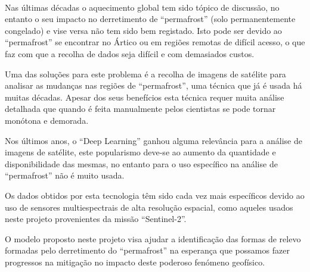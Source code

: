 
\paragraph{}
Nas últimas décadas o aquecimento global tem sido tópico de discussão, no entanto o seu impacto no derretimento de “permafrost” (solo permanentemente congelado) e vise versa não tem sido bem registado. Isto pode ser devido ao “permafrost” se encontrar no Ártico ou em regiões remotas de difícil acesso, o que faz com que a recolha de dados seja difícil e com demasiados custos.

Uma das soluções para este problema é a recolha de imagens de satélite para analisar as mudanças nas regiões de “permafrost”, uma técnica que já é usada há muitas décadas. Apesar dos seus benefícios esta técnica requer muita análise detalhada que quando é feita manualmente pelos cientistas se pode tornar monótona e demorada.

Nos últimos anos, o “Deep Learning” ganhou alguma relevância para a análise de imagens de satélite, este popularismo deve-se ao aumento da quantidade e disponibilidade das mesmas, no entanto para o uso específico na análise de “permafrost” não é muito usada.

Os dados obtidos por esta tecnologia têm sido cada vez mais específicos devido ao uso de sensores multiespectrais de alta resolução espacial, como aqueles usados neste projeto provenientes da missão “Sentinel-2”.

O modelo proposto neste projeto visa ajudar a identificação das formas de relevo formadas pelo derretimento do “permafrost” na esperança que possamos fazer progressos na mitigação no impacto deste poderoso fenómeno geofísico.



